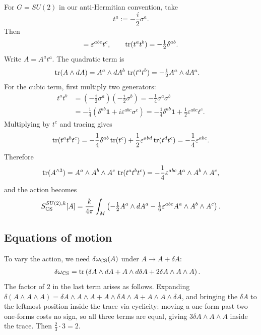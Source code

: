 \begin{example}\label{ex:SU2-action}
For $G = SU(2)$ in our anti-Hermitian convention, take
\begin{equation*}
t^a := -\frac{i}{2}\sigma^a.
\end{equation*}
Then
\begin{equation*}
[t^a,t^b] = \varepsilon^{abc}t^c,
\qquad
\tr(t^at^b) = -\tfrac{1}{2}\delta^{ab}.
\end{equation*}
Write $A = A^at^a$. The quadratic term is
\begin{align*}
\operatorname{tr}(A\wedge dA) &= A^a\wedge dA^b\,\operatorname{tr}(t^at^b) = -\tfrac{1}{2}A^a\wedge dA^a.
\end{align*}
\noindent For the cubic term, first multiply two generators:
\begin{equation*}
\begin{aligned}
t^at^b
&= \left(-\frac{i}{2}\sigma^a\right)\left(-\frac{i}{2}\sigma^b\right)
 = -\frac{1}{4}\sigma^a\sigma^b \\
&= -\frac{1}{4}\left(\delta^{ab}\mathbf{1} + i\varepsilon^{abc}\sigma^c\right)
 = -\frac{1}{4}\delta^{ab}\mathbf{1} + \frac{1}{2}\varepsilon^{abc}t^c.
\end{aligned}
\end{equation*}
\noindent Multiplying by $t^c$ and tracing gives
\begin{equation*}
\operatorname{tr}(t^at^bt^c)
= -\frac{1}{4}\delta^{ab}\operatorname{tr}(t^c) + \frac{1}{2}\varepsilon^{abd}\operatorname{tr}(t^dt^c)
= -\frac{1}{4}\varepsilon^{abc}.
\end{equation*}
Therefore
\begin{equation*}
\operatorname{tr}(A^{\wedge 3})
= A^a\wedge A^b\wedge A^c\,\operatorname{tr}(t^at^bt^c)
= -\frac{1}{4}\varepsilon^{abc}A^a\wedge A^b\wedge A^c,
\end{equation*}
and the action becomes
\begin{equation*}
S_{\operatorname{CS}}^{SU(2),k}[A] = \frac{k}{4\pi}\int_M\left(-\tfrac{1}{2}A^a\wedge dA^a - \tfrac{1}{6}\varepsilon^{abc}A^a\wedge A^b\wedge A^c\right).
\end{equation*}
\end{example}

\subsection{Equations of motion}

To vary the action, we need $\delta \omega_{\operatorname{CS}}(A)$ under $A\to A + \delta A$:
\begin{align*}
\delta \omega_{\operatorname{CS}} &= \operatorname{tr}\left(\delta A\wedge dA + A\wedge d\delta A + 2\delta A\wedge A\wedge A\right).
\end{align*}
The factor of $2$ in the last term arises as follows. Expanding $\delta(A\wedge A\wedge A) = \delta A\wedge A\wedge A + A\wedge \delta A\wedge A + A\wedge A\wedge \delta A$, and bringing the $\delta A$ to the leftmost position inside the trace via cyclicity: moving a one-form past two one-forms costs no sign, so all three terms are equal, giving $3\delta A\wedge A\wedge A$ inside the trace. Then $\tfrac{2}{3}\cdot 3 = 2$.

